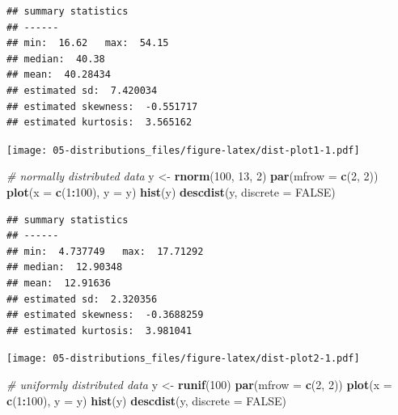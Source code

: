 \documentclass[english,10pt,a4paper,oneside]{book}
\newenvironment{Shaded}{\begin{snugshade}}{\end{snugshade}}
\newcommand{\KeywordTok}[1]{\textcolor[rgb]{0.13,0.29,0.53}{\textbf{#1}}}
\newcommand{\DataTypeTok}[1]{\textcolor[rgb]{0.13,0.29,0.53}{#1}}
\newcommand{\DecValTok}[1]{\textcolor[rgb]{0.00,0.00,0.81}{#1}}
\newcommand{\StringTok}[1]{\textcolor[rgb]{0.31,0.60,0.02}{#1}}
\newcommand{\CommentTok}[1]{\textcolor[rgb]{0.56,0.35,0.01}{\textit{#1}}}
\newcommand{\OtherTok}[1]{\textcolor[rgb]{0.56,0.35,0.01}{#1}}
\newcommand{\OperatorTok}[1]{\textcolor[rgb]{0.81,0.36,0.00}{\textbf{#1}}}
\newcommand{\NormalTok}[1]{#1}
\theoremstyle{definition}
\theoremstyle{definition}
\theoremstyle{definition}
\theoremstyle{remark}
\begin{document}
\begin{verbatim}
## summary statistics
## ------
## min:  16.62   max:  54.15 
## median:  40.38 
## mean:  40.28434 
## estimated sd:  7.420034 
## estimated skewness:  -0.551717 
## estimated kurtosis:  3.565162
\end{verbatim}

\texttt{[image: 05-distributions\_files/figure-latex/dist-plot1-1.pdf]}

\begin{Shaded}
\begin{Highlighting}[]
\CommentTok{# normally distributed data}
\NormalTok{y <-}\StringTok{ }\KeywordTok{rnorm}\NormalTok{(}\DecValTok{100}\NormalTok{, }\DecValTok{13}\NormalTok{, }\DecValTok{2}\NormalTok{)}
\KeywordTok{par}\NormalTok{(}\DataTypeTok{mfrow =} \KeywordTok{c}\NormalTok{(}\DecValTok{2}\NormalTok{, }\DecValTok{2}\NormalTok{))}
\KeywordTok{plot}\NormalTok{(}\DataTypeTok{x =} \KeywordTok{c}\NormalTok{(}\DecValTok{1}\OperatorTok{:}\DecValTok{100}\NormalTok{), }\DataTypeTok{y =}\NormalTok{ y)}
\KeywordTok{hist}\NormalTok{(y)}
\KeywordTok{descdist}\NormalTok{(y, }\DataTypeTok{discrete =} \OtherTok{FALSE}\NormalTok{)}
\end{Highlighting}
\end{Shaded}

\begin{verbatim}
## summary statistics
## ------
## min:  4.737749   max:  17.71292 
## median:  12.90348 
## mean:  12.91636 
## estimated sd:  2.320356 
## estimated skewness:  -0.3688259 
## estimated kurtosis:  3.981041
\end{verbatim}

\texttt{[image: 05-distributions\_files/figure-latex/dist-plot2-1.pdf]}

\begin{Shaded}
\begin{Highlighting}[]
\CommentTok{# uniformly distributed data}
\NormalTok{y <-}\StringTok{ }\KeywordTok{runif}\NormalTok{(}\DecValTok{100}\NormalTok{)}
\KeywordTok{par}\NormalTok{(}\DataTypeTok{mfrow =} \KeywordTok{c}\NormalTok{(}\DecValTok{2}\NormalTok{, }\DecValTok{2}\NormalTok{))}
\KeywordTok{plot}\NormalTok{(}\DataTypeTok{x =} \KeywordTok{c}\NormalTok{(}\DecValTok{1}\OperatorTok{:}\DecValTok{100}\NormalTok{), }\DataTypeTok{y =}\NormalTok{ y)}
\KeywordTok{hist}\NormalTok{(y)}
\KeywordTok{descdist}\NormalTok{(y, }\DataTypeTok{discrete =} \OtherTok{FALSE}\NormalTok{)}
\end{Highlighting}
\end{Shaded}
\end{document}
